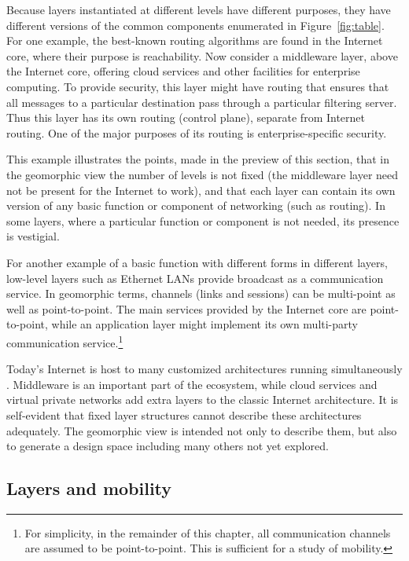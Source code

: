 Because layers instantiated at different levels have different purposes,
they have different versions of the common components enumerated in
Figure~\ref{fig:table}.
For one
example, the best-known routing algorithms are found in the Internet
core, where their purpose is reachability.
Now consider a middleware layer, above the Internet core,
offering cloud services and other facilities for enterprise computing.
To provide security, this layer might have routing that ensures
that all messages
to a particular destination pass
through a particular filtering server.
Thus this layer has its own routing (control plane),
separate from Internet routing.
One of the major purposes of its routing is enterprise-specific
security.

This example
illustrates the points, made in the preview
of this section, that in the geomorphic view the number of levels
is not fixed (the middleware layer need not be present for the Internet
to work),
and that each layer can contain its own version of any basic
function or component of networking (such as routing).
In some layers, where a particular function or component is not
needed, its presence is vestigial.

For another example of a basic function with different forms in
different layers, low-level layers such as Ethernet
LANs provide
broadcast as a communication service.
In geomorphic terms, channels (links and sessions) can be multi-point
as well as point-to-point.
The main
services provided by the Internet core are point-to-point, while
an application layer might implement its own multi-party communication
service.\footnote{For simplicity, in the remainder of this chapter,
all communication channels are assumed to be point-to-point.
This is sufficient for a study of mobility.}

Today's Internet is host to many customized architectures running
simultaneously \cite{roscoe,spatscheck}.
Middleware is an important part of the ecosystem, while cloud services
and virtual private networks
add extra layers to the classic Internet architecture.
It is self-evident that fixed layer structures cannot describe
these architectures adequately.
The geomorphic view is intended not only to describe them,
but also to generate a design space including many others not yet
explored.

\subsection{Layers and mobility}
\label{sec:layers.and.mobility}

